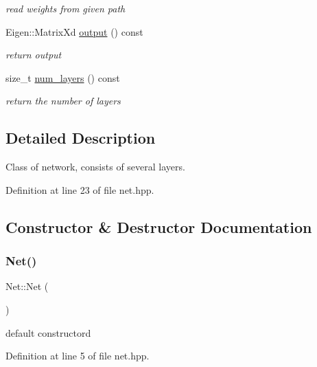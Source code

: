 \begin{DoxyCompactItemize}
\begin{DoxyCompactList}\small\item\em read weights from given path \end{DoxyCompactList}\item 
Eigen\+::\+Matrix\+Xd \hyperlink{class_net_af4a35015a68b1a2637ec07180ecc615e}{output} () const
\begin{DoxyCompactList}\small\item\em return output \end{DoxyCompactList}\item 
size\+\_\+t \hyperlink{class_net_a85b0b4ea81ac28ab5bff04bae96dfb5a}{num\+\_\+layers} () const
\begin{DoxyCompactList}\small\item\em return the number of layers \end{DoxyCompactList}\end{DoxyCompactItemize}


\subsection{Detailed Description}
Class of network, consists of several layers. 

Definition at line 23 of file net.\+hpp.



\subsection{Constructor \& Destructor Documentation}
\mbox{\label{class_net_aaad4df79dedd0dda74f7b9c061867338}} 
\subsubsection{\texorpdfstring{Net()}{Net()}}
{\footnotesize\ttfamily Net\+::\+Net (\begin{DoxyParamCaption}{ }\end{DoxyParamCaption})}



default constructord 



Definition at line 5 of file net.\+hpp.

\mbox{\label{class_net_a517bf56cd781eafd5c7aabeca60b62b0}} 
